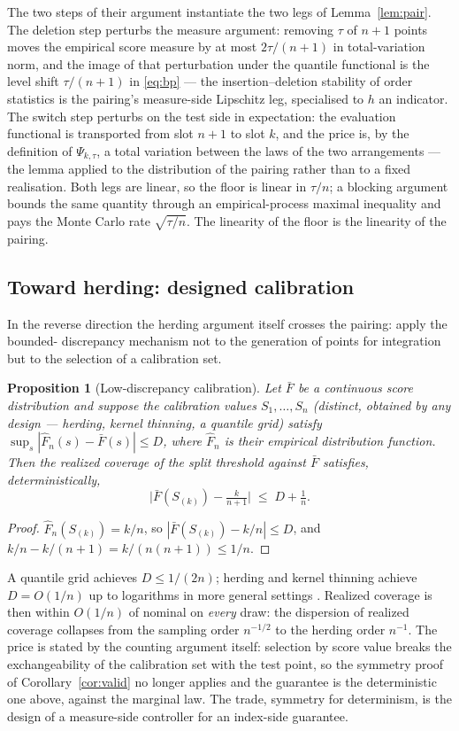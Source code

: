 \documentclass[11pt]{article}
\newtheorem{proposition}{Proposition}
\theoremstyle{remark}
\begin{document}
The two steps of their argument instantiate the two legs of Lemma~\ref{lem:pair}. The deletion
step perturbs the measure argument: removing $\tau$ of $n+1$ points moves the empirical score
measure by at most $2\tau/(n+1)$ in total-variation norm, and the image of that perturbation
under the quantile functional is the level shift $\tau/(n+1)$ in \eqref{eq:bp} --- the
insertion--deletion stability of order statistics is the pairing's measure-side Lipschitz leg,
specialised to $h$ an indicator. The switch step perturbs on the test side in expectation: the
evaluation functional is transported from slot $n+1$ to slot $k$, and the price is, by the
definition of $\Psi_{k,\tau}$, a total variation between the laws of the two arrangements ---
the lemma applied to the distribution of the pairing rather than to a fixed realisation. Both
legs are linear, so the floor is linear in $\tau/n$; a blocking argument
\citep{oliveira2024} bounds the same quantity through an empirical-process maximal inequality
and pays the Monte Carlo rate $\sqrt{\tau/n}$. The linearity of the floor is the linearity of the pairing.

\subsection{Toward herding: designed calibration}\label{sec:design}

In the reverse direction the herding argument itself crosses the pairing: apply the bounded-%
discrepancy mechanism not to the generation of points for integration but to the selection of a
calibration set.

\begin{proposition}[Low-discrepancy calibration]\label{prop:design}
Let $\bar F$ be a continuous score distribution and suppose the calibration values
$S_1,\dots,S_n$ (distinct, obtained by any design --- herding, kernel thinning, a quantile grid)
satisfy $\sup_s|\hat F_n(s)-\bar F(s)|\le D$, where $\hat F_n$ is their empirical distribution
function. Then the realized coverage of the split threshold against $\bar F$ satisfies,
deterministically,
\[
\bigl|\bar F(S_{(k)})-\tfrac{k}{n+1}\bigr|\;\le\;D+\tfrac1n .
\]
\end{proposition}

\begin{proof}
$\hat F_n(S_{(k)})=k/n$, so $|\bar F(S_{(k)})-k/n|\le D$, and $k/n-k/(n+1)=k/(n(n+1))\le 1/n$.
\end{proof}

A quantile grid achieves $D\le 1/(2n)$; herding and kernel thinning achieve $D=O(1/n)$ up to
logarithms in more general settings \citep{chen2010,dwivedi2021}. Realized coverage is then
within $O(1/n)$ of nominal on \emph{every} draw: the dispersion of realized coverage collapses
from the sampling order $n^{-1/2}$ to the herding order $n^{-1}$. The price is stated by the
counting argument itself: selection by score value breaks the exchangeability of the calibration
set with the test point, so the symmetry proof of Corollary~\ref{cor:valid} no longer applies and
the guarantee is the deterministic one above, against the marginal law. The trade, symmetry for determinism, is the design of a measure-side controller for an index-side guarantee.
\end{document}
